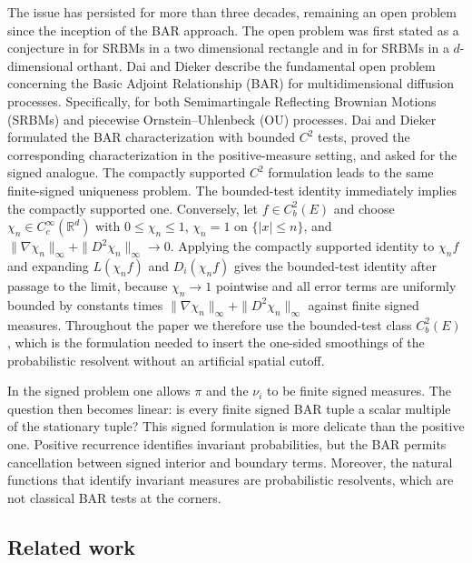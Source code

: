 \documentclass[aihp]{imsart}
\numberwithin{equation}{section}
\theoremstyle{plain}
\theoremstyle{definition}
\newcommand{\1}{\mathbf 1}
\begin{document}
The issue has persisted for more than three decades, remaining an open problem since the inception of the BAR approach. The open problem was first stated as a conjecture in  \cite{DaiHarrison1991} for SRBMs in a two dimensional rectangle and in \cite{DaiHarrison1992} for SRBMs in a $d$-dimensional orthant. Dai and Dieker \cite{DaiDieker2011} describe the fundamental open problem concerning the Basic Adjoint Relationship (BAR) for multidimensional diffusion processes. Specifically, for both Semimartingale Reflecting Brownian Motions (SRBMs) and piecewise Ornstein–Uhlenbeck (OU) processes. Dai and Dieker \cite[Proposition~1 and Open Problem~1]{DaiDieker2011} formulated the BAR characterization with bounded $C^2$ tests, proved the corresponding characterization in the positive-measure setting, and asked for the signed analogue.  The compactly supported $C^2$ formulation leads to the same finite-signed uniqueness problem.  The bounded-test identity immediately implies the compactly supported one.  Conversely, let $f\in C_b^2(E)$ and choose $\chi_n\in C_c^\infty(\mathbb R^d)$ with $0\le\chi_n\le1$, $\chi_n=1$ on $\{|x|\le n\}$, and $\|\nabla\chi_n\|_\infty+\|D^2\chi_n\|_\infty\to0$.  Applying the compactly supported identity to $\chi_n f$ and expanding $L(\chi_n f)$ and $D_i(\chi_n f)$ gives the bounded-test identity after passage to the limit, because $\chi_n\to1$ pointwise and all error terms are uniformly bounded by constants times $\|\nabla\chi_n\|_\infty+\|D^2\chi_n\|_\infty$ against finite signed measures.  Throughout the paper we therefore use the bounded-test class $C_b^2(E)$, which is the formulation needed to insert the one-sided smoothings of the probabilistic resolvent without an artificial spatial cutoff.

In the signed problem one allows $\pi$ and the $\nu_i$ to be finite signed measures.  The question then becomes linear: is every finite signed BAR tuple a scalar multiple of the stationary tuple?  This signed formulation is more delicate than the positive one.  Positive recurrence identifies invariant probabilities, but the BAR permits cancellation between signed interior and boundary terms.  Moreover, the natural functions that identify invariant measures are probabilistic resolvents, which are not classical BAR tests at the corners.

\subsection*{Related work}
\end{document}

